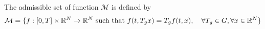 \documentclass[a4paper,10pt]{article}
\begin{document}
The admissible set of function $\mathcal{M}$ is defined by
\begin{equation*}
    \mathcal{M} = \{f:[0,T]\times \mathbb{R}^N \rightarrow \mathbb{R}^N \text{ such that } f(t,T_g x) = T_g f(t,x), \quad \forall T_    g\in G,\forall x\in \mathbb{R}^N \}
\end{equation*}
\end{document}
